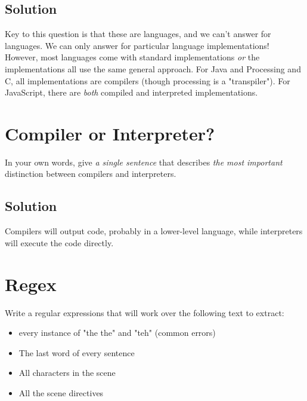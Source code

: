 \documentclass[twoside=false, DIV=14]{scrartcl}
\begin{document}
\subsection*{Solution}
Key to this question is that these are languages, and we can't answer for languages. We can only answer for particular language implementations! However, most languages come with standard implementations \emph{or} the implementations all use the same general approach. For Java and Processing and C, all implementations are compilers (though processing is a "transpiler"). For JavaScript, there are \emph{both} compiled and interpreted implementations.

\section*{Compiler or Interpreter?}
In your own words, give \emph{a single sentence} that describes \emph{the most important} distinction between compilers and interpreters.

\subsection*{Solution}
Compilers will output code, probably in a lower-level language, while interpreters will execute the code directly.

\section*{Regex}
  Write a regular expressions that will work over the following text to extract:
  \begin{itemize}
    \item every instance of "the the" and "teh" (common errors)
    \item The last word of every sentence
    \item All characters in the scene
    \item All the scene directives
  \end{itemize}
\end{document}
